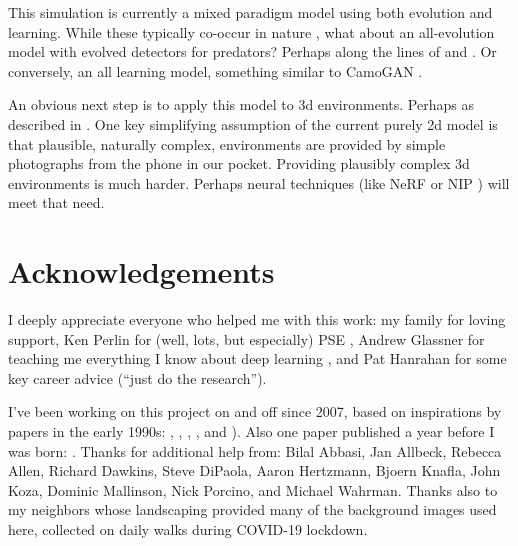 \documentclass[letterpaper]{article}
\begin{document}
\par
This simulation is currently a mixed paradigm model using both evolution and learning. While these typically co-occur in nature \citep{valiant_probably_2013}, what about an all-evolution model with evolved detectors for predators? Perhaps along the lines of \citet{harrington_coevolution_2014} and \citet{bi_genetic_2022}. Or conversely, an all learning model, something similar to CamoGAN \citep{talas_camogan_2020}.
\par
An obvious next step is to apply this model to 3d environments. Perhaps as described in \citet{miller_color_2022}. One key simplifying assumption of the current purely 2d model is that plausible, naturally complex, environments are provided by simple photographs from the phone in our pocket. Providing plausibly complex 3d environments is much harder. Perhaps neural techniques (like NeRF \citep{gao_nerf_2022} or NIP \citep{sharp_spelunking_2022}) will meet that need.
\par



\section{Acknowledgements}
I deeply appreciate everyone who helped me with this work: my family for loving support, Ken Perlin for (well, lots, but especially) PSE \citep{perlin_image_1985}, Andrew Glassner for teaching me everything I know about deep learning \citep{glassner_deep_2021}, and Pat Hanrahan for some key career advice (“just do the research”).
\par
I've been working on this project on and off since 2007, based on inspirations by papers in the early 1990s: \citet{witkin_reaction_1991}, \citet{turk_generating_1991}, \citet{angeline_competitive_1993}, \citet{sims_artificial_1991}, and \citet{sims_evolving_1994}). Also one paper published a year before I was born: \citet{turing_chemical_1952}.
Thanks for additional help from:
Bilal Abbasi,
Jan Allbeck,
Rebecca Allen,
Richard Dawkins,
Steve DiPaola,
Aaron Hertzmann,
Bjoern Knafla,
John Koza,
Dominic Mallinson,
Nick Porcino,
and Michael Wahrman.
Thanks also to my neighbors whose landscaping provided many of the background images used here, collected on daily walks during COVID-19 lockdown.
\par
\end{document}
